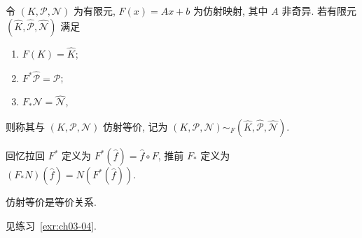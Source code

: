 \begin{Definition}
\label{def:ch03-affine-equivalence}
令 $(K,\mathcal P,\mathcal N)$ 为有限元, $F(x)=Ax+b$ 为仿射映射, 其中 $A$ 非奇异. 若有限元 $(\widehat K,\widehat{\mathcal P},\widehat{\mathcal N})$ 满足
\begin{enumerate}
\item[(i)] $F(K)=\widehat K$;
\item[(ii)] $F^*\widehat{\mathcal P}=\mathcal P$;
\item[(iii)] $F_*\mathcal N=\widehat{\mathcal N}$,
\end{enumerate}
则称其与 $(K,\mathcal P,\mathcal N)$ 仿射等价, 记为 $(K,\mathcal P,\mathcal N)\mathrel{\sim_F}(\widehat K,\widehat{\mathcal P},\widehat{\mathcal N})$.
\end{Definition}

\begin{Remark}
\label{rem:ch03-pullback-pushforward}
回忆拉回 $F^*$ 定义为 $F^*(\widehat f)=\widehat f\circ F$, 推前 $F_*$ 定义为 $(F_*N)(\widehat f)=N(F^*(\widehat f))$.
\end{Remark}

\begin{Proposition}
\label{prop:ch03-affine-equivalence-relation}
仿射等价是等价关系.
\end{Proposition}
\begin{Proof}
见练习~\ref{exr:ch03-04}.
\end{Proof}

